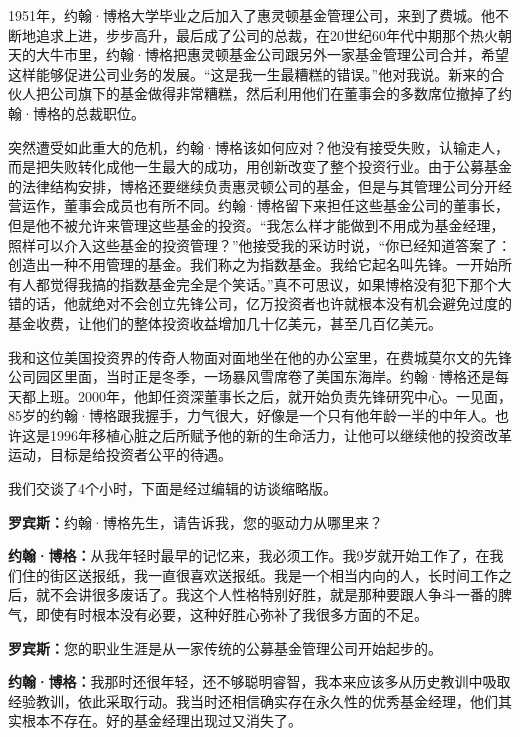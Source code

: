 1951年，约翰·博格大学毕业之后加入了惠灵顿基金管理公司，来到了费城。他不断地追求上进，步步高升，最后成了公司的总裁，在20世纪60年代中期那个热火朝天的大牛市里，约翰·博格把惠灵顿基金公司跟另外一家基金管理公司合并，希望这样能够促进公司业务的发展。“这是我一生最糟糕的错误。”他对我说。新来的合伙人把公司旗下的基金做得非常糟糕，然后利用他们在董事会的多数席位撤掉了约翰·博格的总裁职位。

突然遭受如此重大的危机，约翰·博格该如何应对？他没有接受失败，认输走人，而是把失败转化成他一生最大的成功，用创新改变了整个投资行业。由于公募基金的法律结构安排，博格还要继续负责惠灵顿公司的基金，但是与其管理公司分开经营运作，董事会成员也有所不同。约翰·博格留下来担任这些基金公司的董事长，但是他不被允许来管理这些基金的投资。“我怎么样才能做到不用成为基金经理，照样可以介入这些基金的投资管理？”他接受我的采访时说，“你已经知道答案了：创造出一种不用管理的基金。我们称之为指数基金。我给它起名叫先锋。一开始所有人都觉得我搞的指数基金完全是个笑话。”真不可思议，如果博格没有犯下那个大错的话，他就绝对不会创立先锋公司，亿万投资者也许就根本没有机会避免过度的基金收费，让他们的整体投资收益增加几十亿美元，甚至几百亿美元。

我和这位美国投资界的传奇人物面对面地坐在他的办公室里，在费城莫尔文的先锋公司园区里面，当时正是冬季，一场暴风雪席卷了美国东海岸。约翰·博格还是每天都上班。2000年，他卸任资深董事长之后，就开始负责先锋研究中心。一见面，85岁的约翰·博格跟我握手，力气很大，好像是一个只有他年龄一半的中年人。也许这是1996年移植心脏之后所赋予他的新的生命活力，让他可以继续他的投资改革运动，目标是给投资者公平的待遇。

我们交谈了4个小时，下面是经过编辑的访谈缩略版。

\begin{BookQuote}
\textbf{罗宾斯：}约翰·博格先生，请告诉我，您的驱动力从哪里来？
\end{BookQuote}

\begin{BookQuote}
\textbf{约翰·博格：}从我年轻时最早的记忆来，我必须工作。我9岁就开始工作了，在我们住的街区送报纸，我一直很喜欢送报纸。我是一个相当内向的人，长时间工作之后，就不会讲很多废话了。我这个人性格特别好胜，就是那种要跟人争斗一番的脾气，即使有时根本没有必要，这种好胜心弥补了我很多方面的不足。
\end{BookQuote}

\begin{BookQuote}
\textbf{罗宾斯：}您的职业生涯是从一家传统的公募基金管理公司开始起步的。
\end{BookQuote}

\begin{BookQuote}
\textbf{约翰·博格：}我那时还很年轻，还不够聪明睿智，我本来应该多从历史教训中吸取经验教训，依此采取行动。我当时还相信确实存在永久性的优秀基金经理，他们其实根本不存在。好的基金经理出现过又消失了。
\end{BookQuote}

